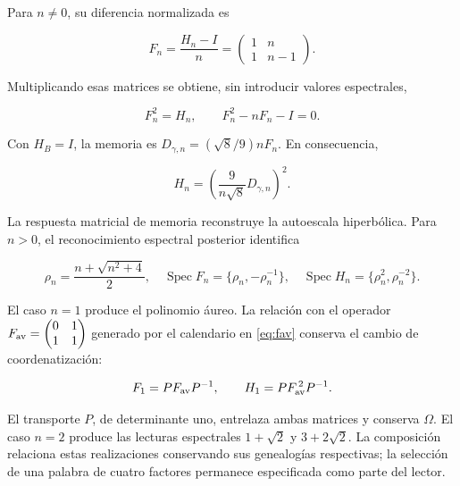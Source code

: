 Para \(n\ne0\), su diferencia normalizada es



\[
F_n=\frac{H_n-I}{n}
=\begin{pmatrix}1&n\\1&n-1\end{pmatrix}.
\]



Multiplicando esas matrices se obtiene, sin introducir valores espectrales,



\begin{equation}
\boxed{F_n^2=H_n,\qquad F_n^2-nF_n-I=0.}
\label{nuc11:eq:29}
\end{equation}



Con \(H_B=I\), la memoria es
\(D_{\gamma,n}=(\sqrt8/9)nF_n\).
En consecuencia,



\begin{equation}
\boxed{H_n=\left(\frac9{n\sqrt8}D_{\gamma,n}\right)^2.}
\label{nuc11:eq:30}
\end{equation}



La respuesta matricial de memoria reconstruye la autoescala
hiperbólica. Para \(n>0\), el reconocimiento espectral posterior
identifica



\begin{equation}
\rho_n=\frac{n+\sqrt{n^2+4}}2,\quad
\operatorname{Spec}F_n=\{\rho_n,-\rho_n^{-1}\},\quad
\operatorname{Spec}H_n=\{\rho_n^2,\rho_n^{-2}\}.
\label{nuc11:eq:31}
\end{equation}



El caso \(n=1\) produce el polinomio áureo.
La relación con el operador
\(F_{\rm av}=\begin{pmatrix}0&1\\1&1\end{pmatrix}\)
generado por el calendario en \eqref{eq:fav} conserva el cambio
de coordenatización:



\begin{equation}
F_1=PF_{\rm av}P^{-1},\qquad
H_1=PF_{\rm av}^{\,2}P^{-1}.
\label{nuc11:eq:32}
\end{equation}



El transporte \(P\), de determinante uno, entrelaza ambas
matrices y conserva \(\Omega\).
El caso \(n=2\) produce las lecturas espectrales
\(1+\sqrt2\) y \(3+2\sqrt2\).
La composición relaciona estas realizaciones conservando sus
genealogías respectivas; la selección de una palabra de cuatro
factores permanece especificada como parte del lector.

